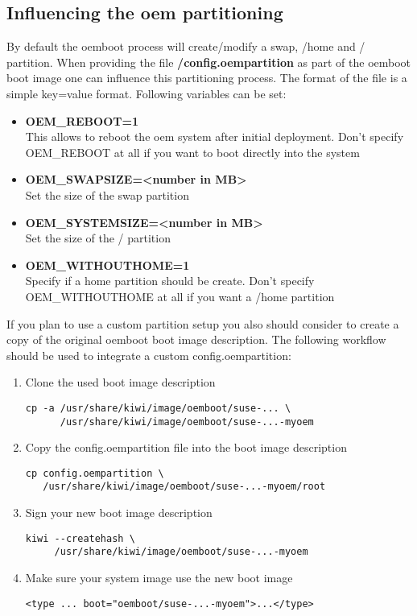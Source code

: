 \subsection{Influencing the oem partitioning}

By default the oemboot process will create/modify a swap, /home and /
partition. When providing the file \textbf{/config.oempartition} as part
of the oemboot boot image one can influence this partitioning process.
The format of the file is a simple key=value format. Following variables
can be set:

\begin{itemize}
\item \textbf{OEM\_REBOOT=1}\\
      This allows to reboot the oem system after initial deployment.
      Don't specify OEM\_REBOOT at all if you want to boot directly into
      the system
\item \textbf{OEM\_SWAPSIZE=<number in MB>}\\
      Set the size of the swap partition
\item \textbf{OEM\_SYSTEMSIZE=<number in MB>}\\
      Set the size of the / partition
\item \textbf{OEM\_WITHOUTHOME=1}\\
      Specify if a home partition should be create. Don't specify
      OEM\_WITHOUTHOME at all if you want a /home partition
\end{itemize}

If you plan to use a custom partition setup you also should consider
to create a copy of the original oemboot boot image description. The following
workflow should be used to integrate a custom config.oempartition:

\begin{enumerate}
\item Clone the used boot image description
\begin{verbatim}
cp -a /usr/share/kiwi/image/oemboot/suse-... \
      /usr/share/kiwi/image/oemboot/suse-...-myoem
\end{verbatim}
\item Copy the config.oempartition file into the boot image description 
\begin{verbatim}
cp config.oempartition \
   /usr/share/kiwi/image/oemboot/suse-...-myoem/root
\end{verbatim}
\item Sign your new boot image description
\begin{verbatim}
kiwi --createhash \
     /usr/share/kiwi/image/oemboot/suse-...-myoem
\end{verbatim}
\item Make sure your system image use the new boot image
\begin{verbatim}
<type ... boot="oemboot/suse-...-myoem">...</type>
\end{verbatim}
\end{enumerate}

